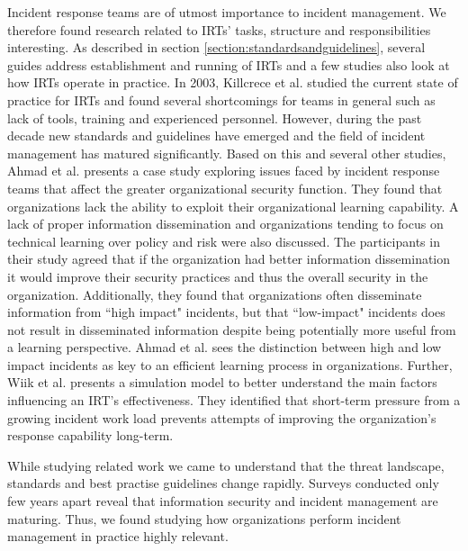 Incident response teams are of utmost importance to incident management. We therefore found research related to \acp{IRT}' tasks, structure and responsibilities interesting. As described in section \ref{section:standardsandguidelines}, several guides address establishment and running of \acp{IRT} and a few studies also look at how \acp{IRT} operate in practice. In 2003, Killcrece et al. \cite{killcrece2003state} studied the current state of practice for \acp{IRT} and found several shortcomings for teams in general such as lack of tools, training and experienced personnel. However, during the past decade new standards and guidelines have emerged and the field of incident management has matured significantly.  Based on this and several other studies, Ahmad et al. \cite{ahmad2012incident} presents a case study exploring issues faced by incident response teams that affect the greater organizational security function. They found that organizations lack the ability to exploit their organizational learning capability. A lack of proper information dissemination and organizations tending to focus on technical learning over policy and risk were also discussed. The participants in their study agreed that if the organization had better information dissemination it would improve their security practices and thus the overall security in the organization. Additionally, they found that organizations often disseminate information from ``high impact" incidents, but that ``low-impact" incidents does not result in disseminated information despite being potentially more useful from a learning perspective. Ahmad et al. sees the distinction between high and low impact incidents as key to an efficient learning process in organizations. Further, Wiik et al. \cite{gonzalezlimits} presents a simulation model to better understand the main factors influencing an \ac{IRT}'s effectiveness. They identified that short-term pressure from a growing incident work load prevents attempts of improving the organization's response capability long-term. 

While studying related work we came to understand that the threat landscape, standards and best practise guidelines change rapidly. Surveys conducted only few years apart reveal that information security and incident management are maturing. Thus, we found studying how organizations perform incident management in practice highly relevant. 

